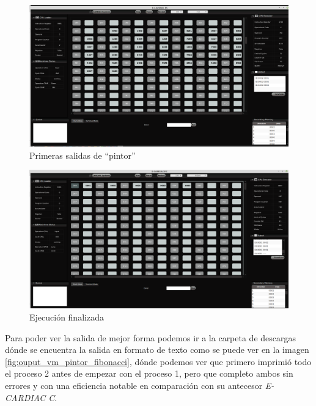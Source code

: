 \documentclass[letterpaper,12pt,oneside]{book}
\begin{document}
			
			
			\begin{figure}[h]		
				\centering
				\includegraphics[scale=0.26]{media/Paralela/vm_starting_to_print_pintor.png}
				\caption{Primeras salidas de ``pintor''}
				\label{fig:vm_starting_to_print_pintor}
			\end{figure}	
			
			
			\begin{figure}[h]		
				\centering
				\includegraphics[scale=0.26]{media/Paralela/vm_finish_the_execution.png}
				\caption{Ejecución finalizada}
				\label{fig:vm_finish_the_execution}
			\end{figure}	
			
			Para poder ver la salida de mejor forma podemos ir a la carpeta de descargas dónde se encuentra la salida en formato
			de texto como se puede ver en la imagen \ref{fig:ouput_vm_pintor_fibonacci}, dónde podemos ver que primero imprimió todo
			el proceso 2 antes de empezar con el proceso 1, pero que completo ambos sin errores y con una eficiencia notable en comparación
			con su antecesor \textit{E-CARDIAC C}.
			
\end{document}
